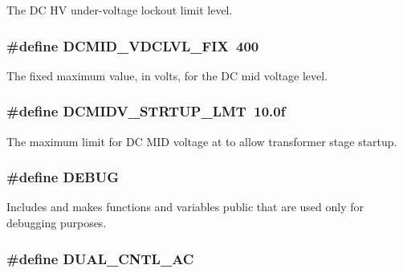 The D\-C H\-V under-\/voltage lockout limit level. \hypertarget{a00043_ad873d002fba2a43978755cfb5e9ad5ee}{
\subsubsection[{D\-C\-M\-I\-D\-\_\-\-V\-D\-C\-L\-V\-L\-\_\-\-F\-I\-X}]{\setlength{\rightskip}{0pt plus 5cm}\#define D\-C\-M\-I\-D\-\_\-\-V\-D\-C\-L\-V\-L\-\_\-\-F\-I\-X~400}}\label{a00043_ad873d002fba2a43978755cfb5e9ad5ee}
The fixed maximum value, in volts, for the D\-C mid voltage level. \hypertarget{a00043_a1bf242d413c347daa05e001e6bf09db6}{
\subsubsection[{D\-C\-M\-I\-D\-V\-\_\-\-S\-T\-R\-T\-U\-P\-\_\-\-L\-M\-T}]{\setlength{\rightskip}{0pt plus 5cm}\#define D\-C\-M\-I\-D\-V\-\_\-\-S\-T\-R\-T\-U\-P\-\_\-\-L\-M\-T~10.\-0f}}\label{a00043_a1bf242d413c347daa05e001e6bf09db6}
The maximum limit for D\-C M\-I\-D voltage at to allow transformer stage startup. \hypertarget{a00043_ad72dbcf6d0153db1b8d8a58001feed83}{
\subsubsection[{D\-E\-B\-U\-G}]{\setlength{\rightskip}{0pt plus 5cm}\#define D\-E\-B\-U\-G}}\label{a00043_ad72dbcf6d0153db1b8d8a58001feed83}
Includes and makes functions and variables public that are used only for debugging purposes. \hypertarget{a00043_a600b96e7a1d3cd28e228833bb61f8074}{
\subsubsection[{D\-U\-A\-L\-\_\-\-C\-N\-T\-L\-\_\-\-A\-C}]{\setlength{\rightskip}{0pt plus 5cm}\#define D\-U\-A\-L\-\_\-\-C\-N\-T\-L\-\_\-\-A\-C}}\label{a00043_a600b96e7a1d3cd28e228833bb61f8074}
